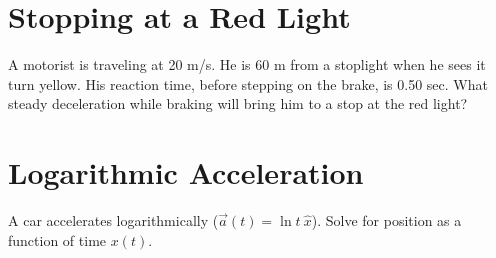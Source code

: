 \documentclass[10pt]{article}
\begin{document}
\section{Stopping at a Red Light}

A motorist is traveling at 20 m/s. He is 60 m from a stoplight when he sees it turn yellow. His reaction time, before stepping on the brake, is 0.50 sec. What steady deceleration while braking will bring him to a stop at the red light? 

\section{Logarithmic Acceleration}

A car accelerates logarithmically ($\vec{a}(t) = \ln{t} \ \hat{x}$). Solve for position as a function of time $x(t)$.
\end{document}
